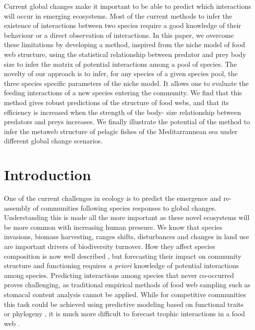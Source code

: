 \documentclass[12pt]{article}
\begin{document}
Current global changes make it important to be able to predict which
interactions will occur in emerging ecosystems. Most of the current methods to
infer the existence of interactions between two species require a good knowledge
of their behaviour or a direct observation of interactions. In this paper, we
overcome these limitations by developing a method, inspired from the niche model
of food web structure, using the statistical relationship between predator and
prey body size to infer the matrix of potential interactions among a pool of
species.  The novelty of our approach is to infer, for any species of a given
species pool, the three species specific parameters of the niche model. It
allows one to evaluate the feeding interactions of a new species entering the
community. We find that this method gives robust predictions of the structure of
food webs, and that its efficiency is increased when the strength of the body-
size relationship between predators and preys increases. We finally illustrate
the potential of the method to infer the metaweb structure of pelagic fishes of
the Meditarrannean sea under different global change scenarios.

\newpage

\section{Introduction}
One of the current challenges in ecology is to predict the emergence and re-assembly of communities following species responses to global changes. Understanding this is made all the more important as these novel ecosystems will be more common with increasing human pressure. We know that species invasions, biomass harvesting, ranges shifts, disturbances and changes in land use are important drivers of biodiversity turnover. How they affect species composition is now well described \parencite{Pereira2010}, but forecasting their impact on community structure and functioning requires \emph{a priori} knowledge of potential interactions among species. Predicting interactions among species that never co-occurred proves challenging, as traditional empirical methods of food web sampling such as stomacal content analysis cannot be applied. While for competitive communities this task could be achieved using predictive modeling based on functional traits \parencite{McGill2006, Albouy2010} or phylogeny \parencite{Cavender-Bares2009, Mouquet2012} , it is much more difficult to forecast trophic interactions in a food web \parencite{Ings2009, Tylianakis2008,Montoya2010}.
\end{document}
